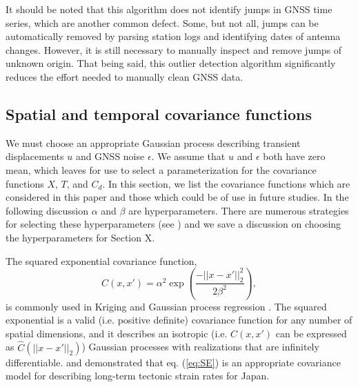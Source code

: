 \documentclass[10pt,a4paper]{article}
\begin{document}
It should be noted that this algorithm does not identify jumps in GNSS time series, which are another common defect. Some, but not all, jumps can be automatically removed by parsing station logs and identifying dates of antenna changes. However, it is still necessary to manually inspect and remove jumps of unknown origin. That being said, this outlier detection algorithm significantly reduces the effort needed to manually clean GNSS data.       



\subsection{Spatial and temporal covariance functions}
We must choose an appropriate Gaussian process describing transient displacements $u$ and GNSS noise $\epsilon$. We assume that $u$ and $\epsilon$ both have zero mean, which leaves for use to select a parameterization for the covariance functions $X$, $T$, and $C_d$.  In this section, we list the covariance functions which are considered in this paper and those which could be of use in future studies. In the following discussion $\alpha$ and $\beta$ are hyperparameters. There are numerous strategies for selecting these hyperparameters (see \citet{Cressie1992}) and we save a discussion on choosing the hyperparameters for Section X.

The squared exponential covariance function,
\begin{equation}\label{eq:SE}
C(x,x') = \alpha^2 \exp\left(\frac{-||x - x'||_2^2}{2 \beta^2}\right),
\end{equation}
is commonly used in Kriging \citep[e.g,][]{Cressie1992} and Gaussian process regression \citep[e.g.,][]{Rasmussen2006}.  The squared exponential is a valid (i.e. positive definite) covariance function for any number of spatial dimensions, and it describes an isotropic (i.e. $C(x,x')$ can be expressed as $\hat{C}(||x - x'||_2)$) Gaussian processes with realizations that are infinitely differentiable.  \citet{Kato1998} and \cite{El-Fiky1999} demonstrated that eq. (\ref{eq:SE}) is an appropriate covariance model for describing long-term tectonic strain rates for Japan.  
\end{document}
